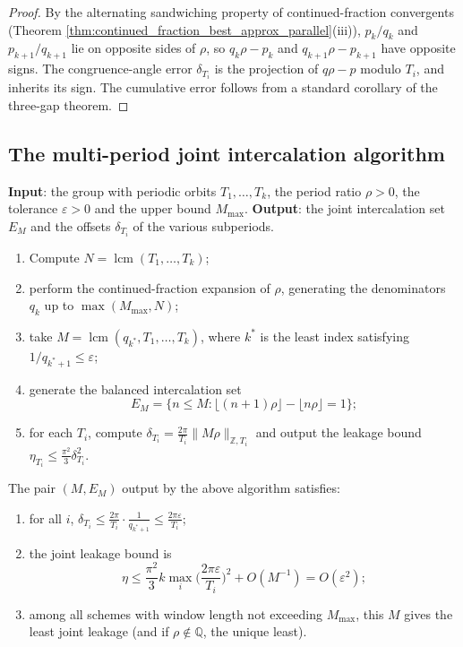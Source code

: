 \begin{proof}
By the alternating sandwiching property of continued-fraction convergents (Theorem \ref{thm:continued_fraction_best_approx_parallel}(iii)), $p_k/q_k$ and $p_{k+1}/q_{k+1}$ lie on opposite sides of $\rho$, so $q_k\rho-p_k$ and $q_{k+1}\rho-p_{k+1}$ have opposite signs. The congruence-angle error $\delta_{T_i}$ is the projection of $q\rho-p$ modulo $T_i$, and inherits its sign. The cumulative error follows from a standard corollary of the three-gap theorem.
\end{proof}

\subsection{The multi-period joint intercalation algorithm}

\begin{definition}\label{def:multi_period_intercalation_algorithm}
\textbf{Input}: the group with periodic orbits $T_1,\dots,T_k$, the period ratio $\rho>0$, the tolerance $\varepsilon>0$ and the upper bound $M_{\max}$. \textbf{Output}: the joint intercalation set $E_M$ and the offsets $\delta_{T_i}$ of the various subperiods.
\begin{enumerate}[label=\textbf{Step \arabic*.}]
    \item Compute $N=\operatorname{lcm}(T_1,\dots,T_k)$;
    \item perform the continued-fraction expansion of $\rho$, generating the denominators $q_k$ up to $\max(M_{\max},N)$;
    \item take $M=\operatorname{lcm}(q_{k^\ast},T_1,\dots,T_k)$, where $k^\ast$ is the least index satisfying $1/q_{k^\ast+1}\le\varepsilon$;
    \item generate the balanced intercalation set
    \[
    E_M=\{n\le M:\lfloor(n+1)\rho\rfloor-\lfloor n\rho\rfloor=1\};
    \]
    \item for each $T_i$, compute $\delta_{T_i}=\frac{2\pi}{T_i}\|M\rho\|_{\mathbb{Z},T_i}$ and output the leakage bound $\eta_{T_i}\le\frac{\pi^2}{3}\delta_{T_i}^2$.
\end{enumerate}
\end{definition}

\begin{theorem}\label{thm:multi_period_intercalation_correctness}
The pair $(M,E_M)$ output by the above algorithm satisfies:
\begin{enumerate}[label=(\roman*)]
    \item for all $i$, $\delta_{T_i}\le\frac{2\pi}{T_i}\cdot\frac{1}{q_{k^\ast+1}}\le\frac{2\pi\varepsilon}{T_i}$;
    \item the joint leakage bound is
    \[
    \eta\le\frac{\pi^2}{3}k\max_i\Big(\frac{2\pi\varepsilon}{T_i}\Big)^2+O(M^{-1})=O(\varepsilon^2);
    \]
    \item among all schemes with window length not exceeding $M_{\max}$, this $M$ gives the least joint leakage (and if $\rho\notin\mathbb{Q}$, the unique least).
\end{enumerate}
\end{theorem}


